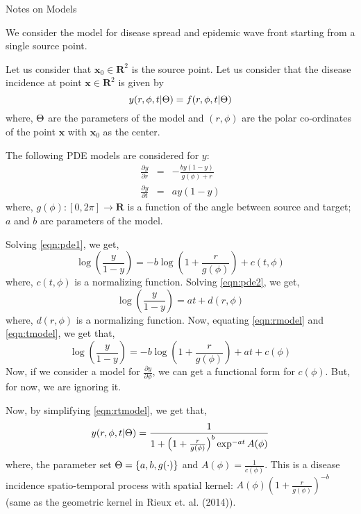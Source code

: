 \documentclass[12pt]{article}
\newcommand{\vx}{\mathbf{x}}
\begin{document}
\begin{center}
{\Large Notes on Models}\\
\vspace*{1cm}
\end{center}

We consider the model for disease spread and epidemic wave front starting from a single source point.

Let us consider that $\vx_0 \in \mathbf{R}^2$ is the source point. Let us consider that the disease incidence at point $\vx \in \mathbf{R}^2$ is given by
\begin{equation}
\label{eqn:model}
y(r, \phi, t|\Theta) = f(r, \phi, t| \Theta)
\end{equation}  
where, $\Theta$ are the parameters of the model and $(r, \phi)$ are the polar co-ordinates of the point $\vx$ with $\vx_0$ as the center.

The following PDE models are considered for $y$:
\begin{eqnarray}
\label{eqn:pde1}
\frac{\partial y}{\partial r} & = & -\frac{by(1-y)}{g(\phi) + r} \\ 
\label{eqn:pde2}
\frac{\partial y}{\partial t} & = & ay(1-y)
\end{eqnarray}
where, $g(\phi):[0, 2\pi] \rightarrow \mathbf{R}$ is a function of the angle between source and target; $a$ and $b$ are parameters of the model.

Solving \eqref{eqn:pde1}, we get,
\begin{equation}
\label{eqn:rmodel}
\log\left(\frac{y}{1-y}\right) = -b\log\left(1 + \frac{r}{g(\phi)}\right) + c(t, \phi)
\end{equation}
where, $c(t, \phi)$ is a normalizing function. Solving \eqref{eqn:pde2}, we get,
\begin{equation}
\label{eqn:tmodel}
\log\left(\frac{y}{1-y}\right) = at + d(r, \phi)
\end{equation}
where, $d(r, \phi)$ is a normalizing function. Now, equating \eqref{eqn:rmodel} and \eqref{eqn:tmodel}, we get that,
\begin{equation}
\label{eqn:rtmodel}
\log\left(\frac{y}{1-y}\right) = -b\log\left(1 + \frac{r}{g(\phi)}\right) + at + c(\phi)
\end{equation}
Now, if we consider a model for $\frac{\partial y}{\partial \phi}$, we can get a functional form for $c(\phi)$. But, for now, we are ignoring it.

Now, by simplifying \eqref{eqn:rtmodel}, we get that,
\begin{equation}
y(r, \phi, t | \Theta) = \frac{1}{1+ \left(1 + \frac{r}{g(\phi)}\right)^b\exp^{-at}A(\phi)}
\end{equation}
where, the parameter set $\Theta = \{a, b, g(\cdot)\}$ and $A(\phi) = \frac{1}{c(\phi)}$. This is a disease incidence spatio-temporal process with spatial kernel: $A(\phi)\left(1 + \frac{r}{g(\phi)}\right)^{-b}$ (same as the geometric kernel in Rieux et. al. (2014)).
\end{document}
